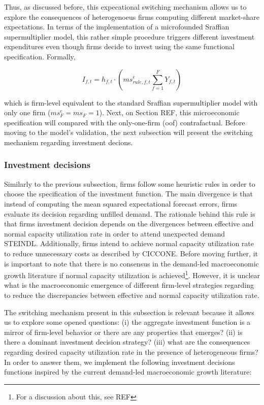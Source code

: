 \documentclass{SelfArx}
\begin{document}
Thus, as discussed before, this expecational switching mechanism allows us to explore the consequences of heterogenoeus firms computing different market-share expectations.
In terms of the implementation of a microfounded Sraffian supermultiplier model, this rather simple procedure triggers different investment expenditures even though firms decide to invest using the same functional specification.
Formally,


\begin{latex}
\begin{equation}
I_{f,t} = h_{f,t} \cdot \left(ms^{e}_{rule,f,t} \sum_{f=1}^{F}Y_{f,t}\right)
\end{equation}
\end{latex}
which is firm-level equivalent to the standard Sraffian supermultiplier model with only one firm (\(ms^{e}_{F} = ms_{F} = 1\)).
Next, on Section REF, this microeconomic specification will compared with the only-one-firm (oof) contrafactual.
Before moving to the model's validation, the next subsection will present the switching mechanism regarding investment decions.

\subsubsection{Investment decisions}
\label{sec:switching_invest}
Similarly to the previous subsection, firms follow some heuristic rules in order to choose the specification of the investment function.
The main divergence is that instead of computing the mean squared expectational forecast errors, firms evaluate its decision regarding unfilled demand.
The rationale behind this rule is that firms investment decision depends on the divergences between effective and normal capacity utilization rate in order to attend unexpected demand STEINDL.
Additionally, firms intend to achieve normal capacity utilization rate to reduce unnecessary costs as described by CICCONE.
Before moving further, it is important to note that there is no consensus in the demand-led macroeconomic growth literature if normal capacity utilization is achieved\footnote{For a discussion about this, see REF}.
However, it is unclear what is the macroeconomic emergence of different firm-level strategies regarding to reduce the discrepancies between effective and normal capacity utilization rate.

The switching mechanism present in this subsection is relevant because it allows us to explore some opened questions:
    (i) the aggregate investment function is a mirror of firm-level behavior or there are any properties that emerges?
    (ii) is there a dominant investment decision strategy?
    (iii) what are the consequences regarding desired capacity utilization rate in the presence of heterogeneous firms?
In order to answer them, we implement the following investment decisions functions inspired by the current demand-led macroeconomic growth literature:
\end{document}
